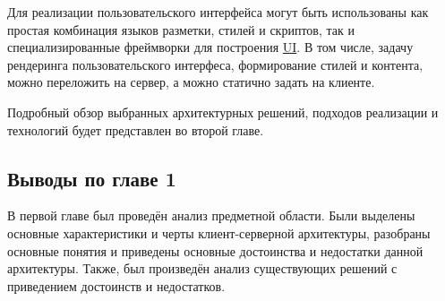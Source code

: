 Для реализации пользовательского интерфейса могут быть использованы как простая комбинация языков разметки, стилей и скриптов, так и специализированные фреймворки для построения \hyperlink{gloss:ui}{UI}.
В том числе, задачу рендеринга пользовательского интерфеса, формирование стилей и контента, можно переложить на сервер, а можно статично задать на клиенте. 

Подробный обзор выбранных архитектурных решений, подходов реализации и технологий будет представлен во второй главе.

\subsection{Выводы по главе 1}\label{subsec:1-conclusion}\indent

В первой главе был проведён анализ предметной области.
Были выделены основные характеристики и черты клиент-серверной архитектуры, разобраны основные понятия и приведены основные достоинства и недостатки данной архитектуры.
Также, был произведён анализ существующих решений с приведением достоинств и недостатков.

